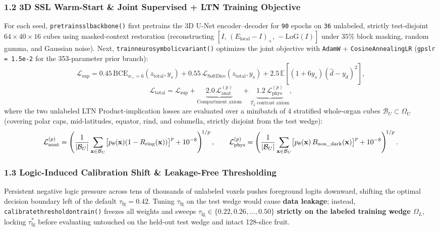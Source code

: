 \documentclass[10pt,a4paper]{article}
\renewcommand{\_}{\origunderscore\allowbreak}
\begin{document}
\subsubsection*{1.2 3D SSL Warm-Start \& Joint Supervised + LTN Training Objective}
For each seed, \texttt{pretrain\_ssl\_backbone()} first pretrains the 3D U-Net encoder--decoder for \texttt{90} epochs on \texttt{36} unlabeled, strictly test-disjoint $64 \times 40 \times 16$ cubes using masked-context restoration (reconstructing $[I,\, (E_{\text{local}} - I)_+,\, -\text{LoG}(I)]$ under $35\%$ block masking, random gamma, and Gaussian noise). Next, \texttt{train\_neurosymbolic\_variant()} optimizes the joint objective with \texttt{AdamW} + \texttt{CosineAnnealingLR} (\texttt{gps\_lr = 1.5e-2} for the 353-parameter prior branch):
\[
\mathcal{L}_{\text{sup}} = 0.45\,\text{BCE}_{w_+=6}(z_{\text{total}}, y_s) + 0.55\,\mathcal{L}_{\text{SoftDice}}(z_{\text{total}}, y_s) + 2.5\,\mathbb{E}\!\left[(1 + 6 y_s)(\hat{d} - y_d)^2\right],
\]
\[
\mathcal{L}_{\text{total}} = \mathcal{L}_{\text{sup}} + \underbrace{2.0\,\mathcal{L}_{\text{anat}}^{(p)}}_{\text{Compartment axiom}} + \underbrace{1.2\,\mathcal{L}_{\text{phys}}^{(p)}}_{T_2\text{ contrast axiom}},
\]
where the two unlabeled LTN Product-implication losses are evaluated over a minibatch of $4$ stratified whole-organ cubes $\mathcal{B}_U \subset \Omega_U$ (covering polar caps, mid-latitudes, equator, rind, and columella, strictly disjoint from the test wedge):
\[
\mathcal{L}_{\text{anat}}^{(p)} = \left(\frac{1}{|\mathcal{B}_U|}\sum_{\mathbf{x}\in\mathcal{B}_U} \bigl[p_\theta(\mathbf{x})(1 - R_{\text{ring}}(\mathbf{x}))\bigr]^p + 10^{-8}\right)^{\!1/p}, \qquad \mathcal{L}_{\text{phys}}^{(p)} = \left(\frac{1}{|\mathcal{B}_U|}\sum_{\mathbf{x}\in\mathcal{B}_U} \bigl[p_\theta(\mathbf{x})\,B_{\text{non\_dark}}(\mathbf{x})\bigr]^p + 10^{-8}\right)^{\!1/p}.
\]

\subsubsection*{1.3 Logic-Induced Calibration Shift \& Leakage-Free Thresholding}
Persistent negative logic pressure across tens of thousands of unlabeled voxels pushes foreground logits downward, shifting the optimal decision boundary left of the default $\tau_{\text{fg}} = 0.42$. Tuning $\tau_{\text{fg}}$ on the test wedge would cause \textbf{data leakage}; instead, \texttt{calibrate\_threshold\_on\_train()} freezes all weights and sweeps $\tau_{\text{fg}} \in \{0.22, 0.26, \dots, 0.50\}$ \textbf{strictly on the labeled training wedge $\Omega_L$}, locking $\tau_{\text{fg}}^*$ before evaluating untouched on the held-out test wedge and intact 128-slice fruit.
\end{document}
